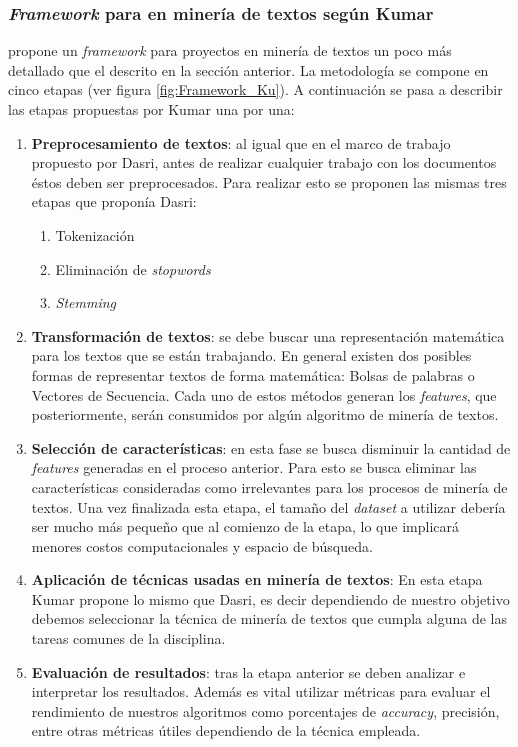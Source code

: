 \subsubsection{\textit{Framework} para en minería de textos según Kumar}
    \cite{kumar2014survey} propone un \textit{framework} para proyectos en minería de textos un poco más detallado que el descrito en la sección anterior. La metodología se compone en cinco etapas (ver figura \ref{fig:Framework_Ku}). A continuación se pasa a describir las etapas propuestas por Kumar una por una:
    \begin{enumerate}
        \item \textbf{Preprocesamiento de textos}: al igual que en el marco de trabajo propuesto por Dasri, antes de realizar cualquier trabajo con los documentos éstos deben ser preprocesados. Para realizar esto se proponen las mismas tres etapas que proponía Dasri:
        \begin{enumerate}
            \item Tokenización
            \item Eliminación de \textit{stopwords}
            \item \textit{Stemming}
        \end{enumerate}
        \item \textbf{Transformación de textos}: se debe buscar una representación matemática para los textos que se están trabajando. En general existen dos posibles formas de representar textos de forma matemática: Bolsas de palabras o Vectores de Secuencia. Cada uno de estos métodos generan los \textit{features}, que posteriormente, serán consumidos por algún algoritmo de minería de textos.
        
        \item \textbf{Selección de características}: en esta fase se busca disminuir la cantidad de \textit{features} generadas en el proceso anterior. Para esto se busca eliminar las características consideradas como irrelevantes para los procesos de minería de textos. Una vez finalizada esta etapa, el tamaño del \textit{dataset} a utilizar debería ser mucho más pequeño que al comienzo de la etapa, lo que implicará menores costos computacionales y espacio de búsqueda.
        \item \textbf{Aplicación de técnicas usadas en minería de textos}: En esta etapa Kumar propone lo mismo que Dasri, es decir  dependiendo de nuestro objetivo debemos seleccionar la técnica de minería de textos que cumpla alguna de las tareas comunes de la disciplina.

        \item \textbf{Evaluación de resultados}: tras la etapa anterior se deben analizar e interpretar los resultados. Además es vital utilizar métricas para evaluar el rendimiento de nuestros algoritmos como porcentajes de \textit{accuracy}, precisión, entre otras métricas útiles dependiendo de la técnica empleada.
    \end{enumerate}
